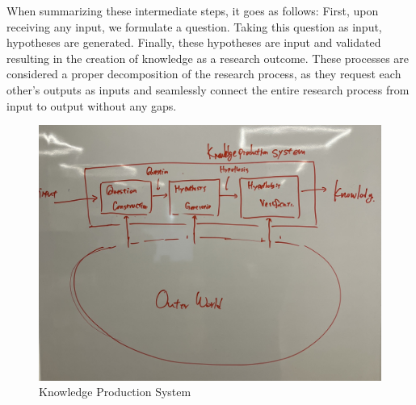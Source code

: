 When summarizing these intermediate steps, it goes as follows: First, upon receiving any input, we formulate a question. Taking this question as input, hypotheses are generated. Finally, these hypotheses are input and validated resulting in the creation of knowledge as a research outcome. These processes are considered a proper decomposition of the research process, as they request each other's outputs as inputs and seamlessly connect the entire research process from input to output without any gaps.


\begin{figure}[htb]
    \centering
    \includegraphics[width=\linewidth]{figs/knowledge_production_system.jpg}
    \caption{Knowledge Production System}
    \label{fig:knowledge_production_system}
\end{figure}


